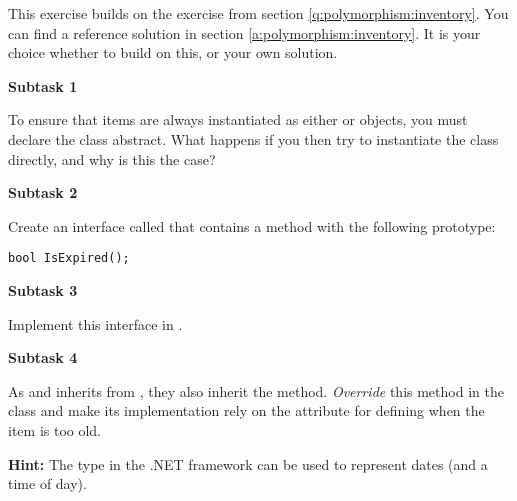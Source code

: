 This exercise builds on the exercise from section \ref{q:polymorphism:inventory}. You can find a reference solution in section \ref{a:polymorphism:inventory}. It is your choice whether to build on this, or your own solution.

\textbf{Subtask 1}

To ensure that items are always instantiated as either  or  objects, you must declare the  class abstract. What happens if you then try to instantiate the  class directly, and why is this the case?

\textbf{Subtask 2}

Create an interface called  that contains a method with the following prototype:

\begin{verbatim}
bool IsExpired();
\end{verbatim}

\textbf{Subtask 3}

Implement this interface in .

\textbf{Subtask 4}

As  and  inherits from , they also inherit the  method. \textsl{Override} this method in the  class and make its implementation rely on the  attribute for defining when the item is too old.

\textbf{Hint:} The  type in the .NET framework can be used to represent dates (and a time of day).

